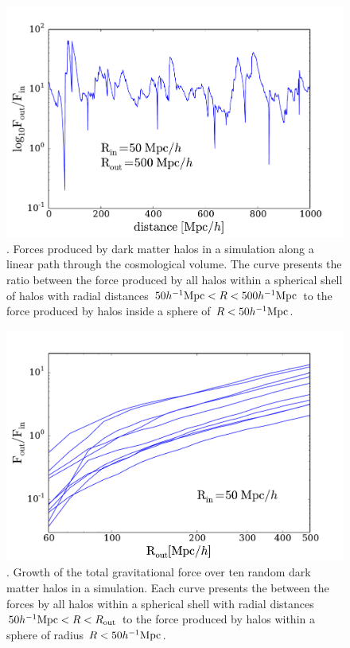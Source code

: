 \documentclass{article}
\newcommand{\hMpc}{{\ifmmode{h^{-1}{\rm Mpc}}\else{$h^{-1}$Mpc }\fi}}
\begin{document}
\begin{figure}
\begin{center}
\includegraphics[width=0.8\linewidth,angle=0]{trace_nbody_200_1000.pdf}
\caption{\label{fig:trace_nbody}. Forces produced by dark matter halos in a
simulation along a linear path through the cosmological volume. The
curve presents the ratio between the force produced by all halos
within a spherical shell of halos with radial distances $50\hMpc
<R<500\hMpc$ to the force produced by halos inside 
a sphere of $R<50\hMpc$. }
\end{center}
\end{figure}



\begin{figure}
\begin{center}
\includegraphics[width=0.8\linewidth,angle=0]{spheres_nbody_radius_200_1000.pdf}
\caption{\label{fig:spheres_radius}. Growth of the total gravitational
  force over ten random dark matter halos in a simulation. Each curve
  presents the between the forces by all halos within a spherical shell with
   radial distances $50\hMpc < R < R_{\rm out}$ to the force produced
   by halos within a sphere of radius $R<50\hMpc$. }  
\end{center}
\end{figure}
\end{document}
